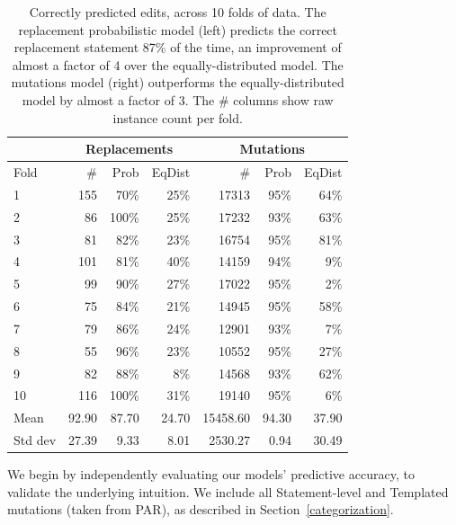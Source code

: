 \documentclass[conference]{IEEEtran}
\begin{document}
\begin{table}[ht]
{\footnotesize
{\centering
\begin{tabular}{l|rrr|rrr}
\toprule
   &\multicolumn{3}{c|}{Replacements} &\multicolumn{3}{c}{Mutations} \\
\midrule
Fold	& \# &Prob& EqDist& \# &Prob& EqDist \\
\midrule
1	& 155&70\%&	25\% &17313&  95\% & 64\%   \\
2	& 86&100\%&	25\%  & 17232& 93\% & 63\%   \\
3	& 81&82\%	&23\%  & 16754& 95\% & 81\% \\
4	& 101&81\%	&40\%  & 14159& 94\% & 9\%   \\
5	& 99&90\%	&27\%  & 17022& 95\% & 2\%  \\
6	& 75&84\%	&21\%  & 14945& 95\%& 58\%  \\
7	& 79&86\%	&24\%  & 12901& 93\%& 7\%  \\
8	& 55&96\%	&23\%  & 10552& 95\%& 27\%  \\
9	& 82&88\%	&8\%  & 14568& 93\%& 62\% \\
10	& 116&100\%	&31\% & 19140 & 95\% & 6\% \\
\midrule
Mean	& 92.90 &87.70	&24.70& 15458.60  & 94.30 & 37.90  \\
\midrule
Std dev	& 27.39&9.33&	8.01 & 2530.27 & 0.94 & 30.49   \\
\bottomrule
\end{tabular}
\center
  \caption{Correctly predicted edits, across 10 folds of data.
The replacement probabilistic model (left) predicts
    the correct replacement statement 87\% of the time,
    an improvement of almost a factor of 4 over the equally-distributed model. 
    The mutations model (right) outperforms the equally-distributed model by 
    almost a factor of 3. The \# columns show raw instance count per fold. \label{results10fcv}} 
}}
\end{table} 


We begin by independently evaluating our models' predictive accuracy, to
validate the underlying intuition.  We include all Statement-level and Templated
mutations (taken from PAR), as described in Section~\ref{categorization}.
\end{document}
